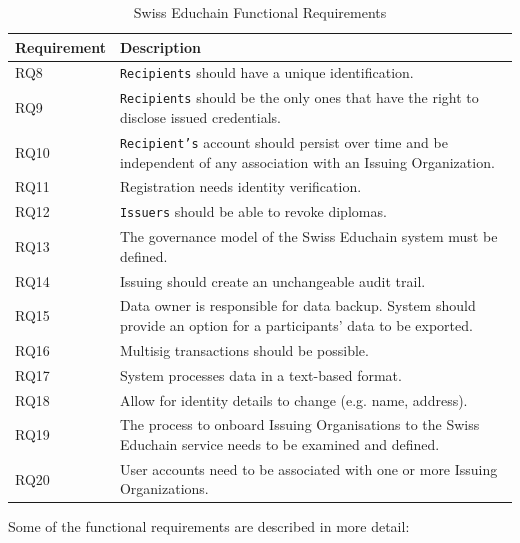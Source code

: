 \begin{table}[h!]
	\centering
	\begin{tabularx}{\textwidth}{| l | X |}
		\hline
		\textbf{Requirement}	& \textbf{Description} \\ \hline
		RQ8 & \texttt{Recipients} should have a unique identification. \\ \hline
		RQ9 & \texttt{Recipients} should be the only ones that have the right to disclose issued credentials. \\ \hline
		RQ10 & \texttt{Recipient's} account should persist over time and be independent of any association with an Issuing Organization.  \\ \hline
		RQ11 & Registration needs identity verification. \\ \hline
		RQ12 & \texttt{Issuers} should be able to revoke diplomas. \\ \hline
		RQ13 & The governance model of the Swiss Educhain system must be defined.  \\ \hline
		RQ14 & Issuing should create an unchangeable audit trail. \\ \hline
		RQ15 & Data owner is responsible for data backup. System should provide an option for a participants' data to be exported. \\ \hline
		RQ16 & Multisig transactions should be possible. \\ \hline
		RQ17 & System processes data in a text-based format.  \\ \hline
		RQ18 & Allow for identity details to change (e.g. name, address). \\ \hline
		RQ19 & The process to onboard Issuing Organisations to the Swiss Educhain service needs to be examined and defined. \\ \hline
		RQ20 & User accounts need to be associated with one or more Issuing Organizations.  \\ \hline
		
	\end{tabularx}
	\caption{Swiss Educhain Functional Requirements}
	\label{tab:func-reqs}
\end{table}

Some of the functional requirements are described in more detail:

